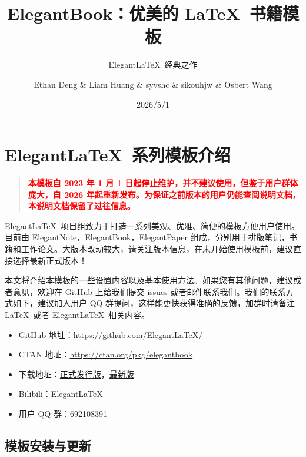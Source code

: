 \documentclass[lang=cn,newtx,10pt,scheme=chinese]{elegantbook}
\title{ElegantBook：优美的 \LaTeX\ 书籍模板}
\subtitle{Elegant\LaTeX\ 经典之作}
\author{Ethan Deng \& Liam Huang \& syvshc \& sikouhjw \& Osbert Wang}
\institute{Elegant\LaTeX\ Program}
\date{2026/5/1}
\begin{document}
\maketitle
\frontmatter

\tableofcontents

\mainmatter

\chapter{Elegant\LaTeX\ 系列模板介绍}

\begin{quotation}
  \textbf{\textcolor{red}{本模板自 2023 年 1 月 1 日起停止维护，并不建议使用，但鉴于用户群体庞大，自 2026 年起重新发布。为保证之前版本的用户仍能查阅说明文档，本说明文档保留了过往信息。}}
\end{quotation}

Elegant\LaTeX\ 项目组致力于打造一系列美观、优雅、简便的模板方便用户使用。目前由 \href{https://github.com/ElegantLaTeX/ElegantNote}{ElegantNote}，\href{https://github.com/ElegantLaTeX/ElegantBook}{ElegantBook}，\href{https://github.com/ElegantLaTeX/ElegantPaper}{ElegantPaper} 组成，分别用于排版笔记，书籍和工作论文。大版本改动较大，请关注版本信息，在未开始使用模板前，建议直接选择最新正式版本！


本文将介绍本模板的一些设置内容以及基本使用方法。如果您有其他问题，建议或者意见，欢迎在 GitHub 上给我们提交 \href{https://github.com/ElegantLaTeX/ElegantBook/issues}{issues} 或者邮件联系我们。我们的联系方式如下，建议加入用户 QQ 群提问，这样能更快获得准确的反馈，加群时请备注 \LaTeX\ 或者 Elegant\LaTeX\ 相关内容。
\begin{itemize}
  \item GitHub 地址：\href{https://github.com/ElegantLaTeX/}{https://github.com/ElegantLaTeX/}
  \item CTAN 地址：\href{https://ctan.org/pkg/elegantbook}{https://ctan.org/pkg/elegantbook}
  \item 下载地址：\href{https://github.com/ElegantLaTeX/ElegantBook/releases}{正式发行版}，\href{https://github.com/ElegantLaTeX/ElegantBook/archive/master.zip}{最新版}
  \item Bilibili：\href{https://space.bilibili.com/516479629}{ElegantLaTeX}
  \item 用户 QQ 群：692108391
\end{itemize}


\section{模板安装与更新}
\end{document}
